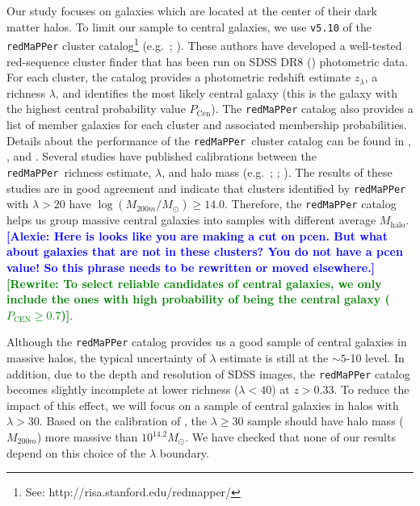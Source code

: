 \documentclass{emulateapj}
\def\redm{\texttt{redMaPPer}}
\def\mhalo{{$M_{\mathrm{halo}}$}}
\newcommand{\alexie}[1]{\textcolor{blue}{\textbf{[Alexie: #1]}}}
\newcommand{\rewrite}[1]{\textcolor{green}{\textbf{[Rewrite: #1]}}}
\begin{document}
\begin{CJK*}{UTF8}{gbsn}
    Our study focuses on galaxies which are located at the center of
    their dark matter halos. To limit our sample to central galaxies, we use 
    \texttt{v5.10} of the \redm{}{} cluster 
    catalog\footnote{See: http://risa.stanford.edu/redmapper/} 
    (e.g.\ \citealt{Rykoff2014}; \citealt{Rozo2015b}). 
    These authors have developed a well-tested red-sequence cluster finder that has been 
    run on SDSS DR8 (\citealt{SDSSDR8}) photometric data. 
    For each cluster, the catalog provides a photometric redshift estimate $z_{\lambda}$, 
    a richness $\lambda$, and identifies the most likely central
    galaxy (this is the galaxy with the highest central probability value
    $P_{\mathrm{Cen}}$). The \redm{}{} catalog also provides a list of member galaxies for each cluster and associated membership probabilities. Details about the performance of the \redm{}~cluster catalog can be found in 
    \citet{Rozo2014}, \citet{Rozo2015a}, and \citet{Rozo2015b}. 
    Several studies have published calibrations between the \redm{}~richness estimate, 
    $\lambda$, and halo mass (e.g.\ \citealt{Saro2015}; \citealt{Farahi2016}; 
    \citealt{Simet2016}). 
    The results of these studies are in good agreement and indicate that clusters 
    identified by \redm{}~ with $\lambda > 20$ have $\log (M_{200m}/M_{\odot}) \geq 14.0$. 
    Therefore, the \redm{} catalog helps us group massive central galaxies into samples with different average \mhalo{}. \alexie{Here is looks like you are making a cut on pcen. But what about galaxies that are not in these clusters? You do not have a pcen value! So this phrase needs to be rewritten or moved elsewhere.}\rewrite{To select reliable candidates of central galaxies, we only include the ones 
    with high probability of being the central galaxy ($P_{\mathrm{CEN}} \geq 0.7$)}.
       
    Although the \redm{} catalog provides us a good sample of central galaxies in 
    massive halos, the typical uncertainty of $\lambda$ estimate is still at the
    $\sim 5$-10 level.  
    In addition, due to the depth and resolution of SDSS images, the \redm{} catalog 
    becomes slightly incomplete at lower richness ($\lambda < 40$) at $z > 0.33$.
    To reduce the impact of this effect, we will focus on a sample of central galaxies in halos with 
    $\lambda > 30$. 
    Based on the calibration of \citet{Simet2016}, the $\lambda \geq 30$ sample should
    have halo mass ($M_{200m}$) more massive than $10^{14.2} M_{\odot}$. We have checked that none of our results depend on this choice of the $\lambda$ boundary.
    

\end{CJK*}
\end{document}
